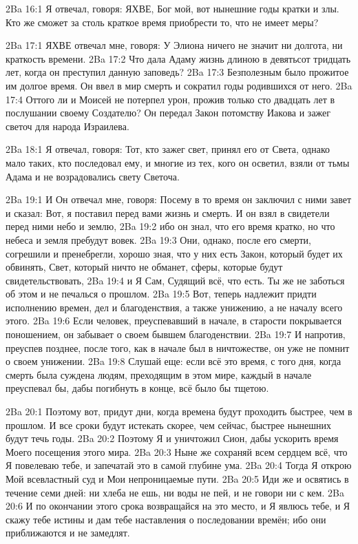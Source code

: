 \vs 2Ba 16:1
Я отвечал, говоря: ЯХВЕ, Бог мой, вот нынешние годы кратки и злы. Кто же сможет за столь краткое время приобрести то, что не имеет меры?

\vs 2Ba 17:1
ЯХВЕ отвечал мне, говоря: У Элиона ничего не значит ни долгота, ни краткость времени.
\vs 2Ba 17:2
Что дала Адаму жизнь длиною в девятьсот тридцать лет, когда он преступил данную заповедь?
\vs 2Ba 17:3
Безполезным было прожитое им долгое время. Он ввел в мир смерть и сократил годы родившихся от него.
\vs 2Ba 17:4
Оттого ли и Моисей не потерпел урон, прожив только сто двадцать лет в послушании своему Создателю? Он передал Закон потомству Иакова и зажег светоч для народа Израилева.

\vs 2Ba 18:1
Я отвечал, говоря: Тот, кто зажег свет, принял его от Света, однако мало таких, кто последовал ему, и многие из тех, кого он осветил, взяли от тьмы Адама и не возрадовались свету Светоча.

\vs 2Ba 19:1
И Он отвечал мне, говоря: Посему в то время он заключил с ними завет и сказал: Вот, я поставил перед вами жизнь и смерть. И он взял в свидетели перед ними небо и землю,
\vs 2Ba 19:2
ибо он знал, что его время кратко, но что небеса и земля пребудут вовек.
\vs 2Ba 19:3
Они, однако, после его смерти, согрешили и пренебрегли, хорошо зная, что у них есть Закон, который будет их обвинять, Свет, который ничто не обманет, сферы, которые будут свидетельствовать,
\vs 2Ba 19:4
и Я Сам, Судящий всё, что есть. Ты же не заботься об этом и не печалься о прошлом.
\vs 2Ba 19:5
Вот, теперь надлежит придти исполнению времен, дел и благоденствия, а также унижению, а не началу всего этого.
\vs 2Ba 19:6
Если человек, преуспевавший в начале, в старости покрывается поношением, он забывает о своем бывшем благоденствии.
\vs 2Ba 19:7
И напротив, преуспев позднее, после того, как в начале был в ничтожестве, он уже не помнит о своем унижении.
\vs 2Ba 19:8
Слушай еще: если всё это время, с того дня, когда смерть была суждена людям, преходящим в этом мире, каждый в начале преуспевал бы, дабы погибнуть в конце, всё было бы тщетою.

\vs 2Ba 20:1
Поэтому вот, придут дни, когда времена будут проходить быстрее, чем в прошлом. И все сроки будут истекать скорее, чем сейчас, быстрее нынешних будут течь годы.
\vs 2Ba 20:2
Поэтому Я и уничтожил Сион, дабы ускорить время Моего посещения этого мира.
\vs 2Ba 20:3
Ныне же сохраняй всем сердцем всё, что Я повелеваю тебе, и запечатай это в самой глубине ума.
\vs 2Ba 20:4
Тогда Я открою Мой всевластный суд и Мои непроницаемые пути.
\vs 2Ba 20:5
Иди же и освятись в течение семи дней: ни хлеба не ешь, ни воды не пей, и не говори ни с кем.
\vs 2Ba 20:6
И по окончании этого срока возвращайся на это место, и Я явлюсь тебе, и Я скажу тебе истины и дам тебе наставления о последовании времён; ибо они приближаются и не замедлят.

